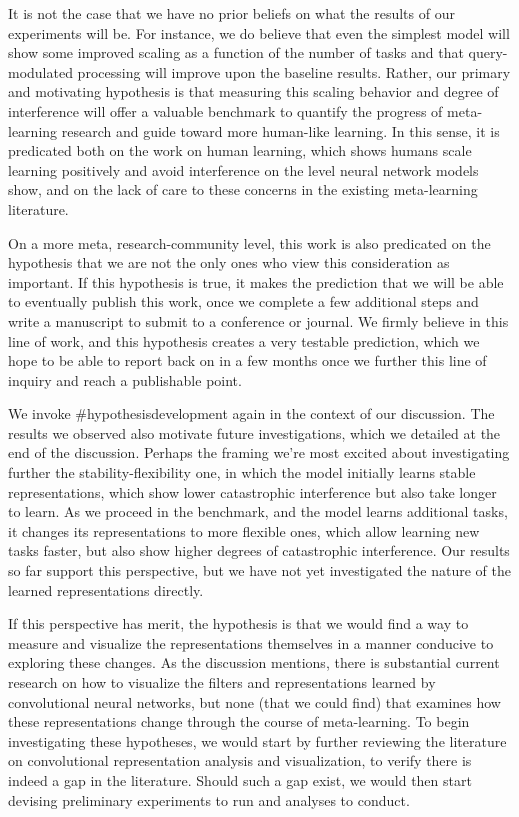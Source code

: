It is not the case that we have no prior beliefs on what the results of our experiments will be. For instance, we do believe that even the simplest model will show some improved scaling as a function of the number of tasks and that query-modulated processing will improve upon the baseline results. Rather, our primary and motivating hypothesis is that measuring this scaling behavior and degree of interference will offer a valuable benchmark to quantify the progress of meta-learning research and guide toward more human-like learning. In this sense, it is predicated both on the work on human learning, which shows humans scale learning positively and avoid interference on the level neural network models show, and on the lack of care to these concerns in the existing meta-learning literature. 

On a more meta, research-community level, this work is also predicated on the hypothesis that we are not the only ones who view this consideration as important. If this hypothesis is true, it makes the prediction that we will be able to eventually publish this work, once we complete a few additional steps and write a manuscript to submit to a conference or journal. We firmly believe in this line of work, and this hypothesis creates a very testable prediction, which we hope to be able to report back on in a few months once we further this line of inquiry and reach a publishable point.   

We invoke \#hypothesisdevelopment again in the context of our discussion. The results we observed also motivate future investigations, which we detailed at the end of the discussion. Perhaps the framing we're most excited about investigating further the stability-flexibility one, in which the model initially learns stable representations, which show lower catastrophic interference but also take longer to learn. As we proceed in the benchmark, and the model learns additional tasks, it changes its representations to more flexible ones, which allow learning new tasks faster, but also show higher degrees of catastrophic interference. Our results so far support this perspective, but we have not yet investigated the nature of the learned representations directly.

If this perspective has merit, the hypothesis is that we would find a way to measure and visualize the representations themselves in a manner conducive to exploring these changes. As the discussion mentions, there is substantial current research on how to visualize the filters and representations learned by convolutional neural networks, but none (that we could find) that examines how these representations change through the course of meta-learning. To begin investigating these hypotheses, we would start by further reviewing the literature on convolutional representation analysis and visualization, to verify there is indeed a gap in the literature. Should such a gap exist, we would then start devising preliminary experiments to run and analyses to conduct.  

